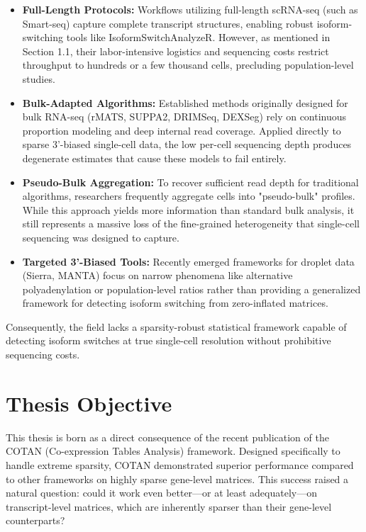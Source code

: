 \begin{itemize}
    \item \textbf{Full-Length Protocols:} Workflows utilizing full-length scRNA-seq (such as Smart-seq) capture complete transcript structures, enabling robust isoform-switching tools like IsoformSwitchAnalyzeR. However, as mentioned in Section 1.1, their labor-intensive logistics and sequencing costs restrict throughput to hundreds or a few thousand cells, precluding population-level studies.
    
    \item \textbf{Bulk-Adapted Algorithms:} Established methods originally designed for bulk RNA-seq (rMATS, SUPPA2, DRIMSeq, DEXSeg) rely on continuous proportion modeling and deep internal read coverage. Applied directly to sparse 3'-biased single-cell data, the low per-cell sequencing depth produces degenerate estimates that cause these models to fail entirely.
    
    \item \textbf{Pseudo-Bulk Aggregation:} To recover sufficient read depth for traditional algorithms, researchers frequently aggregate cells into "pseudo-bulk" profiles. While this approach yields more information than standard bulk analysis, it still represents a massive loss of the fine-grained heterogeneity that single-cell sequencing was designed to capture.
    
    \item \textbf{Targeted 3'-Biased Tools:} Recently emerged frameworks for droplet data (Sierra, MANTA) focus on narrow phenomena like alternative polyadenylation or population-level ratios rather than providing a generalized framework for detecting isoform switching from zero-inflated matrices.
\end{itemize}

Consequently, the field lacks a sparsity-robust statistical framework capable of detecting isoform switches at true single-cell resolution without prohibitive sequencing costs.

\section{Thesis Objective}
This thesis is born as a direct consequence of the recent publication of the COTAN (Co-expression Tables Analysis) framework. Designed specifically to handle extreme sparsity, COTAN demonstrated superior performance compared to other frameworks on highly sparse gene-level matrices. This success raised a natural question: could it work even better—or at least adequately—on transcript-level matrices, which are inherently sparser than their gene-level counterparts?

